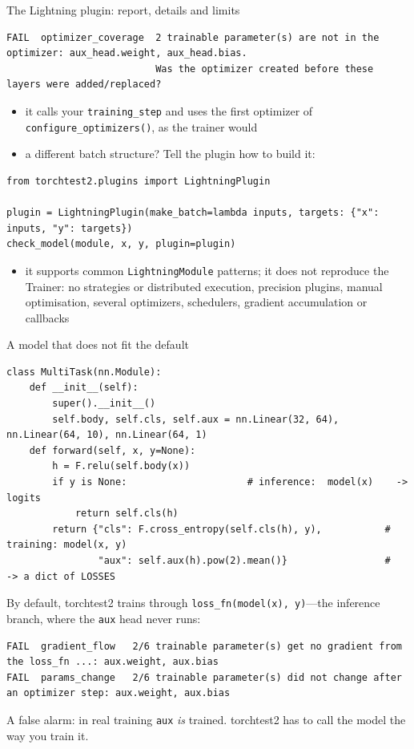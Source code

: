 \documentclass[aspectratio=169,11pt]{beamer}
\newcommand{\tool}{\textsf{torchtest2}}
\begin{document}
\begin{frame}[fragile]{The Lightning plugin: report, details and limits}
  \begin{lstlisting}[style=report]
FAIL  optimizer_coverage  2 trainable parameter(s) are not in the optimizer: aux_head.weight, aux_head.bias.
                          Was the optimizer created before these layers were added/replaced?
  \end{lstlisting}
  \begin{itemize}
    \item it calls \alert{your} \texttt{training\_step} and uses the first optimizer of
          \texttt{configure\_optimizers()}, as the trainer would
    \item a different batch structure? Tell the plugin how to build it:
  \end{itemize}
  \begin{lstlisting}
from torchtest2.plugins import LightningPlugin

plugin = LightningPlugin(make_batch=lambda inputs, targets: {"x": inputs, "y": targets})
check_model(module, x, y, plugin=plugin)
  \end{lstlisting}
  \begin{itemize}
    \item it supports \alert{common} \texttt{LightningModule} patterns; it does \alert{not}
          reproduce the Trainer: no strategies or distributed execution, precision plugins,
          manual optimisation, several optimizers, schedulers, gradient accumulation or callbacks
  \end{itemize}
\end{frame}

\begin{frame}[fragile]{A model that does not fit the default}
  \begin{lstlisting}
class MultiTask(nn.Module):
    def __init__(self):
        super().__init__()
        self.body, self.cls, self.aux = nn.Linear(32, 64), nn.Linear(64, 10), nn.Linear(64, 1)
    def forward(self, x, y=None):
        h = F.relu(self.body(x))
        if y is None:                     # inference:  model(x)    -> logits
            return self.cls(h)
        return {"cls": F.cross_entropy(self.cls(h), y),           # training: model(x, y)
                "aux": self.aux(h).pow(2).mean()}                 #   -> a dict of LOSSES
  \end{lstlisting}
  By default, \tool{} trains through \texttt{loss\_fn(model(x), y)}---the inference branch, where
  the \texttt{aux} head never runs:
  \begin{lstlisting}[style=report]
FAIL  gradient_flow   2/6 trainable parameter(s) get no gradient from the loss_fn ...: aux.weight, aux.bias
FAIL  params_change   2/6 trainable parameter(s) did not change after an optimizer step: aux.weight, aux.bias
  \end{lstlisting}
  \small A false alarm: in real training \texttt{aux} \emph{is} trained. \tool{} has to call the
  model the way you train it.
\end{frame}
\end{document}
